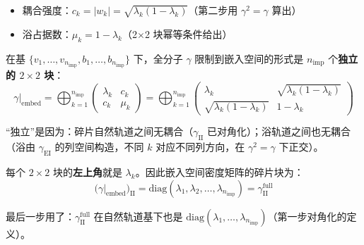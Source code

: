 \documentclass[11pt,a4paper]{article}
\begin{document}
\begin{itemize}
  \item 耦合强度：$c_k = |w_k| = \sqrt{\lambda_k(1-\lambda_k)}$（第二步用 $\gamma^2 = \gamma$ 算出）
  \item 浴占据数：$\mu_k = 1 - \lambda_k$（2$\times$2 块幂等条件给出）
\end{itemize}

在基 $\{v_1, \ldots, v_{n_{\text{imp}}}, b_1, \ldots, b_{n_{\text{imp}}}\}$ 下，全分子 $\gamma$ 限制到嵌入空间的形式是 $n_{\text{imp}}$ 个\textbf{独立的 $2 \times 2$ 块}：
\begin{equation}
  \gamma\big|_{\text{embed}} = \bigoplus_{k=1}^{n_{\text{imp}}} \begin{pmatrix} \lambda_k & c_k \\ c_k & \mu_k \end{pmatrix}
  = \bigoplus_{k=1}^{n_{\text{imp}}} \begin{pmatrix} \lambda_k & \sqrt{\lambda_k(1-\lambda_k)} \\ \sqrt{\lambda_k(1-\lambda_k)} & 1-\lambda_k \end{pmatrix}
\end{equation}

``独立''是因为：碎片自然轨道之间无耦合（$\gamma_{\text{II}}$ 已对角化）；浴轨道之间也无耦合（浴由 $\gamma_{\text{EI}}$ 的列空间构造，不同 $k$ 对应不同列方向，在 $\gamma^2 = \gamma$ 下正交）。

每个 $2 \times 2$ 块的\textbf{左上角}就是 $\lambda_k$。因此嵌入空间密度矩阵的碎片块为：
\begin{equation}
  \big(\gamma\big|_{\text{embed}}\big)_{\text{II}} = \text{diag}(\lambda_1, \lambda_2, \ldots, \lambda_{n_{\text{imp}}}) = \gamma_{\text{II}}^{\text{full}}
\end{equation}

最后一步用了：$\gamma_{\text{II}}^{\text{full}}$ 在自然轨道基下也是 $\text{diag}(\lambda_1, \ldots, \lambda_{n_{\text{imp}}})$（第一步对角化的定义）。
\end{document}
